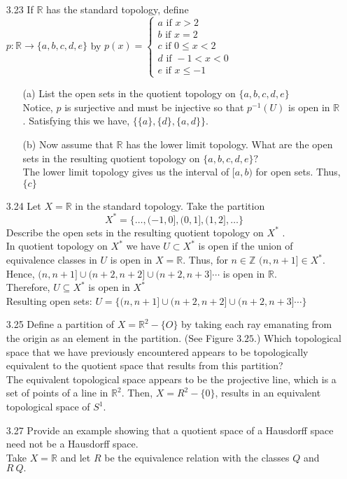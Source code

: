 \documentclass[12pt]{article}
\newcommand{\Z}{\mathds{Z}}
\newcommand{\R}{\mathds{R}}
\begin{document}
\begin{enumerate}
	\item[3.23] If $ \R $ has the standard topology, define \\
	$p : \mathbb { R } \rightarrow \{ a , b , c , d , e \}$ by $p ( x ) = \left\{ \begin{array} { l } { a \text { if } x > 2 } \\ { b \text { if } x = 2 } \\ { c \text { if } 0\leq x < 2 }  \\ { d \text { if } - 1 < x < 0 } \\ { e \text { if } x \leq - 1 } \end{array} \right.$
	\begin{enumerate}
		\item[(a)] List the open sets in the quotient topology on $\{ a , b , c , d , e \}$\\
		Notice, $ p $ is surjective and must be injective so that $ p^{-1}(U) $ is open in $ \R $. Satisfying this we have, $ \{\{a\},\{d\},\{a,d\}\} $.
		
		\item[(b)] Now assume that $\mathbb { R }$ has the lower limit topology. What are the open sets in the resulting quotient topology on $\{ a , b , c , d , e \} ?$\\
		The lower limit topology gives us the interval of $ [a,b) $ for open sets. Thus, $ \{c\} $
	\end{enumerate}

	\item[3.24] Let $X = \mathbb { R }$ in the standard topology. Take the partition
		\[X ^ { * } = \{ \ldots , ( - 1,0 ] , ( 0,1 ] , ( 1,2 ] , \ldots \}\]
	Describe the open sets in the resulting quotient topology on $X ^ { * }$ .\\
	In quotient topology on $ X^* $ we have $ U\subset X^* $ is open if the union of equivalence classes in $ U $ is open in $ X=\R $. Thus, for $ n\in\Z $ $ (n,n+1]\in X^* $. Hence, $ (n,n+1]\cup(n+2,n+2]\cup(n+2,n+3]\cdots $ is open in $ \R $. \\
	Therefore, $ U\subseteq X^* $ is open in $ X^*$\\
	Resulting open sets: $U =\{(n,n+1]\cup(n+2,n+2]\cup(n+2,n+3]\cdots\} $
	
	\item[3.25] Define a partition of $X = \mathbb { R } ^ { 2 } - \{ O \}$ by taking each ray emanating from the origin as an element in the partition. (See Figure $3.25 .$) Which topological space that we have previously encountered appears to be topologically equivalent to the quotient space that results from this partition?\\
	The equivalent topological space appears to be the projective line, which is a set of points of a line in $ \R^2 $. Then, $ X = R^2-\{0\} $, results in an equivalent topological space of $ S^1 $.
	\item[3.27] Provide an example showing that a quotient space of a Hausdorff space need not be a Hausdorff space.\\
	Take $ X = \R $ and let $ R $ be the equivalence relation with the classes $ Q $ and $ R\ Q. $                          
	

\end{enumerate}
\end{document}
